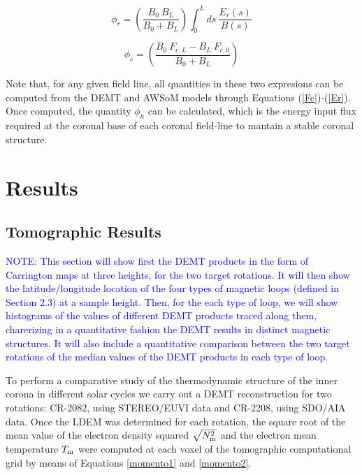 \documentclass[namedreferences]{solarphysics}
\newcommand{\Tm}{T_{\rm m}}
\newcommand{\Nsqm}{N^2_{{\rm m}}}
\newcommand{\sqravgN}{\sqrt{\Nsqm}}
\def\notebyalbert#1{\textcolor{blue}{NOTE: #1}}
\begin{document}
\begin{article}
\begin{equation}\label{phi_r}
\phi_r = \left( \frac{B_0 \ B_L}{B_0 + B_L} \right) \int_{0}^{L} ds \ \frac{E_r(s)}{B(s)}
\end{equation}

\begin{equation}\label{phi_c}
\phi_c = \left( \frac{B_0 \ F_{c,L} - B_L \ F_{c,0}}{B_0 + B_L} \right) 
\end{equation}

{Note that, for any given field line, all quantities in these two expresions can be computed from the DEMT and AWSoM models through Equations (\ref{Fc})-(\ref{Er}). Once computed, the quantity $\phi_h$ can be calculated, which is the energy input flux required at the coronal base of each coronal field-line to mantain a stable coronal structure.}


\section{Results}\label{resu} 

\subsection{Tomographic Results}\label{demt_res} 

\noindent\notebyalbert{This section will show first the DEMT products in the form of Carrington maps at three heights, for the two target rotations. It will then show the latitude/longitude location of the four types of  magnetic loops (defined in Section 2.3) at a sample height. Then, for the each type of loop, we will show histograms of the values of different DEMT products traced along them, charerizing in a quantitative fashion the DEMT results in distinct magnetic structures. It will also include a quantitative comparison between the two target rotations of the median values of the DEMT products in each type of loop.}

{To perform a comparative study of the thermodynamic structure of the inner corona in different solar cycles
we carry out a DEMT reconstruction for two rotations: CR-2082, using STEREO/EUVI data and CR-2208, using SDO/AIA data.} {Once the LDEM was determined for each rotation, the square root of the mean value of the electron density squared $\sqravgN$ and the electron mean temperature $\Tm$ were computed at each voxel of the tomographic computational grid by means of Equations \ref{momento1} and \ref{momento2}.} 


\end{article}
\end{document}

